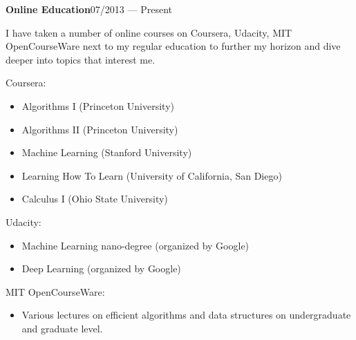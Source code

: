 \vspace{-2mm}
\begin{entry}{\textbf{Online Education}}{}{07/2013 --- Present}
  \item I have taken a number of online courses on Coursera, Udacity, MIT OpenCourseWare next to my regular education to further my horizon and dive deeper into topics that interest me.
  \item Coursera:
  \begin{itemize}
    \item Algorithms I (Princeton University)
    \item Algorithms II (Princeton University)
    \item Machine Learning (Stanford University)
    \item Learning How To Learn (University of California, San Diego)
    \item Calculus I (Ohio State University)
  \end{itemize}
  \item Udacity:
  \begin{itemize}
    \item Machine Learning nano-degree (organized by Google)
    \item Deep Learning (organized by Google)
  \end{itemize}
  \item MIT OpenCourseWare:
  \begin{itemize}
    \item Various lectures on efficient algorithms and data structures on undergraduate and graduate level.
  \end{itemize}
\end{entry}

